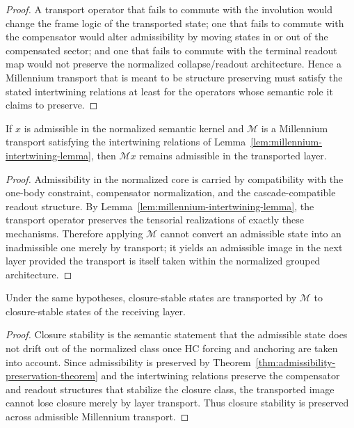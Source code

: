 \begin{proof}
A transport operator that fails to commute with the involution would change the
frame logic of the transported state; one that fails to commute with the
compensator would alter admissibility by moving states in or out of the
compensated sector; and one that fails to commute with the terminal readout map
would not preserve the normalized collapse/readout architecture. Hence a
Millennium transport that is meant to be structure preserving must satisfy the
stated intertwining relations at least for the operators whose semantic role it
claims to preserve.
\end{proof}

\begin{theorem}
\label{thm:admissibility-preservation-theorem}
If $x$ is admissible in the normalized semantic kernel and $\mathcal M$ is a
Millennium transport satisfying the intertwining relations of
Lemma~\ref{lem:millennium-intertwining-lemma}, then $\mathcal Mx$ remains
admissible in the transported layer.
\end{theorem}

\begin{proof}
Admissibility in the normalized core is carried by compatibility with the one-body
constraint, compensator normalization, and the cascade-compatible readout
structure. By Lemma~\ref{lem:millennium-intertwining-lemma}, the transport
operator preserves the tensorial realizations of exactly these mechanisms.
Therefore applying $\mathcal M$ cannot convert an admissible state into an
inadmissible one merely by transport; it yields an admissible image in the next
layer provided the transport is itself taken within the normalized grouped
architecture.
\end{proof}

\begin{theorem}
\label{thm:closure-preservation-theorem}
Under the same hypotheses, closure-stable states are transported by
$\mathcal M$ to closure-stable states of the receiving layer.
\end{theorem}

\begin{proof}
Closure stability is the semantic statement that the admissible state does not
drift out of the normalized class once HC forcing and anchoring are taken into
account. Since admissibility is preserved by
Theorem~\ref{thm:admissibility-preservation-theorem} and the intertwining
relations preserve the compensator and readout structures that stabilize the
closure class, the transported image cannot lose closure merely by layer
transport. Thus closure stability is preserved across admissible Millennium
transport.
\end{proof}

